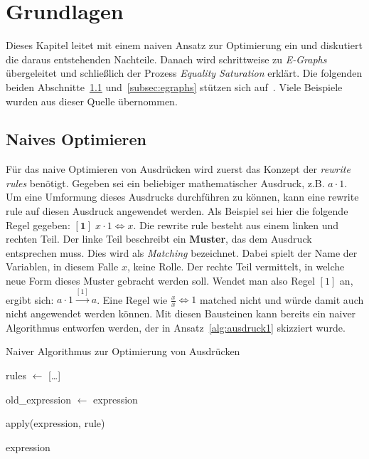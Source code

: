 \section{Grundlagen}\label{sec:grundlagen}

Dieses Kapitel leitet mit einem naiven Ansatz zur Optimierung ein und diskutiert die daraus entstehenden Nachteile.
Danach wird schrittweise zu \textit{E-Graphs}
übergeleitet und schließlich der Prozess \textit{Equality Saturation} erklärt.
Die folgenden beiden Abschnitte~\ref{subsec:naiv} und~\ref{subsec:egraphs} stützen sich auf~\cite{cole}. Viele Beispiele wurden aus dieser Quelle übernommen.

\subsection{Naives Optimieren}\label{subsec:naiv}

Für das naive Optimieren von Ausdrücken wird zuerst das Konzept der \textit{rewrite rules} benötigt. Gegeben sei ein beliebiger mathematischer Ausdruck, z.B.
$a \cdot 1$. Um eine Umformung dieses Ausdrucks durchführen zu können, kann eine rewrite rule auf diesen Ausdruck angewendet werden.
Als Beispiel sei hier die folgende Regel gegeben: $[\mathbf{1}]\; x \cdot 1 \Leftrightarrow x$. Die rewrite rule besteht aus einem linken und rechten Teil. Der linke Teil
beschreibt ein \textbf{Muster}, das dem Ausdruck entsprechen muss. Dies wird als \textit{Matching} bezeichnet. Dabei spielt der Name der Variablen, in diesem Falle $x$, keine Rolle.
Der rechte Teil vermittelt, in welche neue Form dieses Muster gebracht werden soll. Wendet man also Regel $[1]$ an,
ergibt sich: $a \cdot 1  \overset{[1]}{\rightarrow} a$. 
Eine Regel wie $\frac{x}{x} \Leftrightarrow 1$ matched nicht und würde damit auch nicht angewendet werden können.
Mit diesen Bausteinen kann bereits ein naiver Algorithmus entworfen werden, der in Ansatz~\ref{alg:ausdruck1} skizziert wurde. 

\begin{algorithm}[H]
  \caption{Naiver Algorithmus zur Optimierung von Ausdrücken}\label{alg:ausdruck1}
  \begin{algorithmic}
    \State rules $\gets$ [\ldots]
    
      \State old\_expression $\gets$ expression

        \State apply(expression, rule)
        \EndIf
      \EndFor
    \EndWhile

    \State \Return expression
    \EndFunction
  \end{algorithmic}
\end{algorithm}

